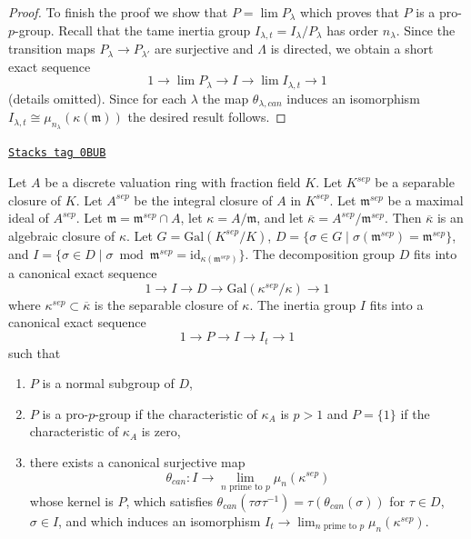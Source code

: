\begin{proof}
\medskip\noindent
To finish the proof we show that $P = \lim P_\lambda$ which proves
that $P$ is a pro-$p$-group. Recall that the tame inertia group
$I_{\lambda, t} = I_\lambda/P_\lambda$ has order $n_\lambda$.
Since the transition maps $P_\lambda \to P_{\lambda'}$ are surjective
and $\Lambda$ is directed, we obtain a short exact sequence
$$
1 \to \lim P_\lambda \to I \to \lim I_{\lambda, t} \to 1
$$
(details omitted). Since for each $\lambda$ the map $\theta_{\lambda, can}$
induces an isomorphism
$I_{\lambda, t} \cong \mu_{n_\lambda}(\kappa(\mathfrak m))$
the desired result follows.
\end{proof}

\begin{lemma}
\label{pione-lemma-structure-decomposition-separable-closure}
\href{https://stacks.math.columbia.edu/tag/0BUB}{\texttt{Stacks tag 0BUB}}

Let $A$ be a discrete valuation ring with fraction field $K$.
Let $K^{sep}$ be a separable closure of $K$.
Let $A^{sep}$ be the integral closure of $A$ in $K^{sep}$.
Let $\mathfrak m^{sep}$ be a maximal ideal of $A^{sep}$.
Let $\mathfrak m = \mathfrak m^{sep} \cap A$, let
$\kappa = A/\mathfrak m$, and let
$\overline{\kappa} = A^{sep}/\mathfrak m^{sep}$.
Then $\overline{\kappa}$ is an algebraic closure of $\kappa$.
Let $G = \text{Gal}(K^{sep}/K)$,
$D = \{\sigma \in G \mid \sigma(\mathfrak m^{sep}) = \mathfrak m^{sep}\}$, and
$I = \{\sigma \in D \mid \sigma \bmod \mathfrak m^{sep} =
\text{id}_{\kappa(\mathfrak m^{sep})}\}$.
The decomposition group $D$ fits into a canonical exact sequence
$$
1 \to I \to D \to \text{Gal}(\kappa^{sep}/\kappa) \to 1
$$
where $\kappa^{sep} \subset \overline{\kappa}$ is the separable
closure of $\kappa$.
The inertia group $I$ fits into a canonical exact sequence
$$
1 \to P \to I \to I_t \to 1
$$
such that
\begin{enumerate}
\item $P$ is a normal subgroup of $D$,
\item $P$ is a pro-$p$-group if the characteristic of
$\kappa_A$ is $p > 1$ and $P = \{1\}$ if the characteristic of $\kappa_A$
is zero,
\item there exists a canonical surjective map
$$
\theta_{can} : I \to \lim_{n\text{ prime to }p} \mu_n(\kappa^{sep})
$$
whose kernel is $P$, which satisfies
$\theta_{can}(\tau \sigma \tau^{-1}) = \tau(\theta_{can}(\sigma))$
for $\tau \in D$, $\sigma \in I$, and which induces an isomorphism
$I_t \to \lim_{n\text{ prime to }p} \mu_n(\kappa^{sep})$.
\end{enumerate}
\end{lemma}

